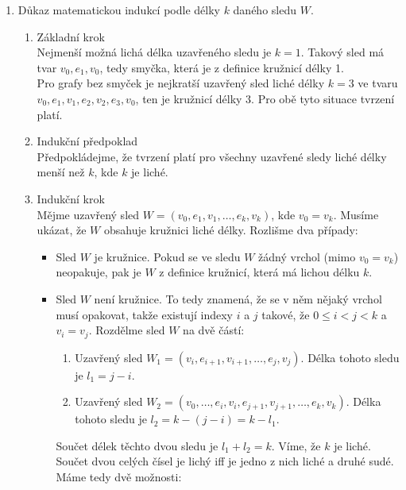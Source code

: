 \documentclass[11pt,a4paper]{article}
\begin{document}
\begin{solution}
\titlebreak
\begin{enumerate}
    \item Důkaz matematickou indukcí podle délky $k$ daného sledu $W$.
    \begin{enumerate}
        \item Základní krok \\
        Nejmenší možná lichá délka uzavřeného sledu je $k=1$. Takový sled má tvar $v_0, e_1, v_0$, tedy smyčka, která je 
        z definice kružnicí délky 1. \\
        Pro grafy bez smyček je nejkratší uzavřený sled liché délky $k=3$ ve tvaru \\ 
        $v_0, e_1, v_1, e_2, v_2, e_3, v_0$, ten je kružnicí délky $3$. Pro obě tyto situace tvrzení platí.
        \item Indukční předpoklad \\
        Předpokládejme, že tvrzení platí pro všechny uzavřené sledy liché délky menší než $k$, kde $k$ je liché.
        \item Indukční krok \\
        Mějme uzavřený sled $W = (v_0, e_1, v_1, \dots, e_k, v_k)$, kde $v_0 = v_k$. Musíme ukázat, že $W$ obsahuje 
        kružnici liché délky. Rozlišme dva případy:
        \begin{itemize}
            \item Sled $W$ je kružnice. Pokud se ve sledu $W$ žádný vrchol (mimo $v_0=v_k$) neopakuje, pak je $W$ z 
            definice kružnicí, která má lichou délku $k$.
            \item Sled $W$ není kružnice. To tedy znamená, že se v něm nějaký vrchol musí opakovat, takže existují 
            indexy $i$ a $j$ takové, že $0 \leq i < j < k$ a $v_i = v_j$. Rozdělme sled $W$ na dvě částí:
            \begin{enumerate}[(1)]
                \item Uzavřený sled $W_1 = (v_i, e_{i+1}, v_{i+1}, \dots, e_j, v_j)$. Délka tohoto sledu je $l_1 = j-i$.
                \item Uzavřený sled $W_2 = (v_0, \dots, e_i, v_i, e_{j+1}, v_{j+1}, \dots, e_k, v_k)$. Délka tohoto 
                sledu je $l_2 = k - (j-i) = k - l_1$.
            \end{enumerate}
            Součet délek těchto dvou sledu je $l_1 + l_2 = k$. Víme, že $k$ je liché. Součet dvou celých čísel je lichý
            iff je jedno z nich liché a druhé sudé. Máme tedy dvě možnosti:

\end{itemize}
\end{enumerate}
\end{enumerate}
\end{solution}
\end{document}
